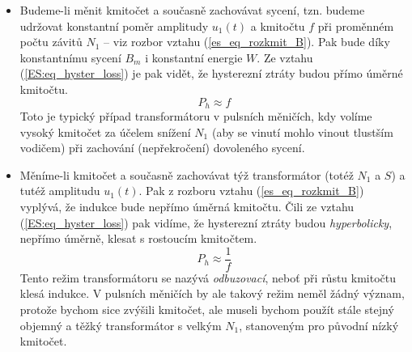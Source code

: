 {      \begin{itemize}
        \item Budeme-li měnit kmitočet a současně zachovávat sycení, tzn. budeme udržovat  
              konstantní poměr amplitudy  $u_1(t)$ a kmitočtu $f$ při proměnném počtu závitů $N_1$ 
              – viz rozbor vztahu (\ref{es_eq_rozkmit_B}). Pak bude díky konstantnímu sycení $B_m$ 
              i konstantní energie $W$. Ze vztahu (\ref{ES:eq_hyster_loss}) je pak vidět, že 
              hysterezní ztráty budou přímo úměrné kmitočtu.
              \begin{equation}\label{ES:eq_hyst_loss_linf}
                P_h \approx f
              \end{equation}
              Toto je typický případ transformátoru v pulsních měničích, kdy volíme vysoký kmitočet 
              za účelem snížení  $N_1$ (aby se vinutí mohlo vinout tlustším vodičem) při zachování 
              (nepřekročení) dovoleného sycení.
        \item Měníme-li kmitočet a současně zachovávat týž transformátor (totéž $N_1$ a $S$) a  
              tutéž amplitudu $u_1(t)$. Pak z rozboru vztahu (\ref{es_eq_rozkmit_B}) vyplývá, že 
              indukce bude nepřímo úměrná kmitočtu.  Čili ze vztahu (\ref{ES:eq_hyster_loss}) pak 
              vidíme, že hysterezní ztráty budou \emph{hyperbolicky}, nepřímo úměrně, klesat s 
              rostoucím kmitočtem.
              \begin{equation}\label{ES:eq_hyst_loss_hypf}
                P_h \approx \frac{1}{f}
              \end{equation}
              Tento režim transformátoru se nazývá \emph{odbuzovací}, neboť při růstu kmitočtu 
              klesá indukce. V pulsních měničích by ale takový režim neměl žádný význam, protože 
              bychom sice zvýšili kmitočet, ale museli bychom použít stále stejný objemný a těžký 
              transformátor s velkým $N_1$, stanoveným pro původní nízký kmitočet.
      \end{itemize}

}
